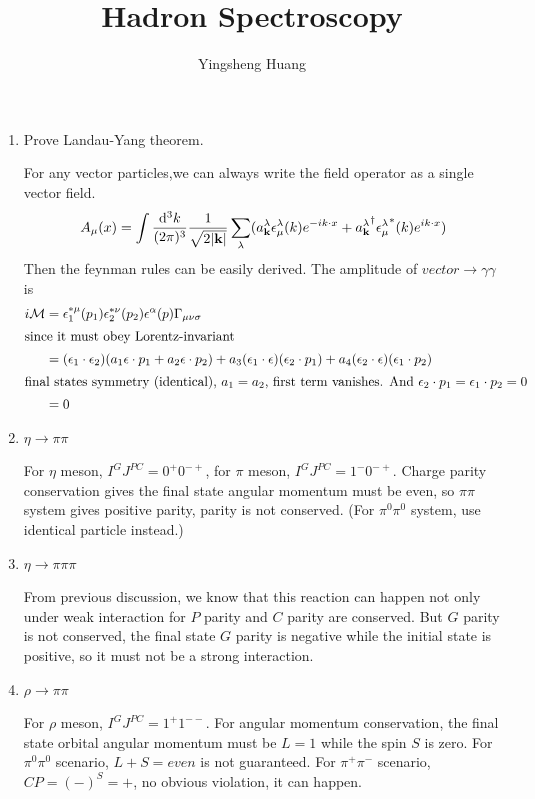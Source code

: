 \documentclass{article}
\title{Hadron Spectroscopy}
\author{Yingsheng Huang}
\newcommand{\vbk}{\vb{k}}
\newcommand{\g}{\gamma}
\renewcommand{\a}{\alpha}
\newcommand{\la}{\lambda}
\newcommand{\s}{\sigma}
\begin{document}
\maketitle

\begin{enumerate}
  \item Prove Landau-Yang theorem.

	For any vector particles,we can always write the field operator as a single vector field.
  $$A_{\mu}(x)=\int\frac{\dd^3k}{(2\pi)^3}\frac{1}{\sqrt{2\abs{\vb{k}}}}\sum_{\la}(a^{\la}_{\vbk}\epsilon^{\la}_{\mu}(k)e^{-ik\cdot x}+{a^{\la}_{\vbk}}^{\dagger}{\epsilon^{\la}_{\mu}}^*(k)e^{ik\cdot x})$$
  Then the feynman rules can be easily derived. The amplitude of $vector\rightarrow \g\g$ is
  \begin{align*}
    i\mathcal{M}&=\epsilon_1^{*\mu}(p_1)\epsilon_2^{*\nu}(p_2)\epsilon^{\a}(p)\Gamma_{\mu\nu\s}\\
    \intertext{since it must obey Lorentz-invariant}
    &=(\epsilon_1\cdot\epsilon_2)(a_1\epsilon\cdot p_1+a_2\epsilon\cdot p_2)+a_3(\epsilon_1\cdot \epsilon)(\epsilon_2\cdot p_1)+a_4(\epsilon_2\cdot \epsilon)(\epsilon_1\cdot p_2)\\
    \intertext{final states symmetry (identical), $a_1=a_2$, first term vanishes. And $\epsilon_2\cdot p_1=\epsilon_1\cdot p_2=0$}
    &=0
  \end{align*}
  \item $\eta\rightarrow\pi\pi$

  For $\eta$ meson, $I^GJ^{PC}=0^+0^{-+}$, for $\pi$ meson, $I^GJ^{PC}=1^-0^{-+}$. Charge parity conservation gives the final state angular momentum must be even, so $\pi\pi$ system gives positive parity, parity is not conserved. (For $\pi^0\pi^0$ system, use identical particle instead.)

  \item $\eta\rightarrow\pi\pi\pi$

	From previous discussion, we know that this reaction can happen not only under weak interaction for $P$ parity and $C$ parity are conserved. But $G$ parity is not conserved, the final state $G$ parity is negative while the initial state is positive, so it must not be a strong interaction.

	\item $\rho\rightarrow\pi\pi$

	  For $\rho$ meson, $I^GJ^{PC}=1^+1^{--}$. For angular momentum conservation, the final state orbital angular momentum must be $L=1$ while the spin $S$ is zero. For $\pi^0\pi^0$ scenario, $L+S=even$ is not guaranteed. For $\pi^+\pi^-$ scenario, $CP=(-)^S=+$, no obvious violation, it can happen.


\end{enumerate}
\end{document}
